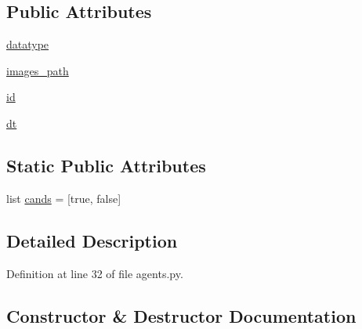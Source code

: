 \subsection*{Public Attributes}
\begin{DoxyCompactItemize}
\item 
\hyperlink{classparlai_1_1tasks_1_1nlvr_1_1agents_1_1DefaultTeacher_a0d82ff42ca2bdc37d2cc0dde80dc67ef}{datatype}
\item 
\hyperlink{classparlai_1_1tasks_1_1nlvr_1_1agents_1_1DefaultTeacher_a2f3e63f887c9884ac7d12aee734c9a19}{images\+\_\+path}
\item 
\hyperlink{classparlai_1_1tasks_1_1nlvr_1_1agents_1_1DefaultTeacher_a7809defc508b35dd2fcaae25173db4a6}{id}
\item 
\hyperlink{classparlai_1_1tasks_1_1nlvr_1_1agents_1_1DefaultTeacher_a6473aea8efc0cffb97b718bb024207ac}{dt}
\end{DoxyCompactItemize}
\subsection*{Static Public Attributes}
\begin{DoxyCompactItemize}
\item 
list \hyperlink{classparlai_1_1tasks_1_1nlvr_1_1agents_1_1DefaultTeacher_a527b12f02b10d05be6ec782cd57c3b22}{cands} = \mbox{[}\textquotesingle{}true\textquotesingle{}, \textquotesingle{}false\textquotesingle{}\mbox{]}
\end{DoxyCompactItemize}


\subsection{Detailed Description}


Definition at line 32 of file agents.\+py.



\subsection{Constructor \& Destructor Documentation}
\mbox{\label{classparlai_1_1tasks_1_1nlvr_1_1agents_1_1DefaultTeacher_a5d4a9625d4bd1de73a9815bb791da051}} 
